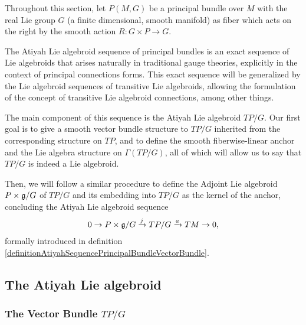 Throughout this section, let $P(M, G)$ be a principal bundle over $M$ with the real Lie group $G$ (a finite dimensional, smooth manifold) as fiber which acts on the right by the smooth action $R: G \times P \to G$.

The Atiyah Lie algebroid sequence of principal bundles is an exact sequence of Lie algebroids that arises naturally in traditional gauge theories, explicitly in the context of principal connections forms. This exact sequence will be generalized by the Lie algebroid sequences of transitive Lie algebroids, allowing the formulation of the concept of transitive Lie algebroid connections, among other things.

The main component of this sequence is the Atiyah Lie algebroid $TP/G$. Our first goal is to give a smooth vector bundle structure to $TP/G$ inherited from the corresponding structure on $TP$, and to define the smooth fiberwise-linear anchor and the Lie algebra structure on $\Gamma(TP/G)$, all of which will allow us to say that $TP/G$ is indeed a Lie algebroid.

Then, we will follow a similar procedure to define the Adjoint Lie algebroid $P \times \mathfrak{g}/G$ of $TP/G$ and its embedding into $TP/G$ as the kernel of the anchor, concluding the Atiyah Lie algebroid sequence
\begin{align*}
    0 \to P \times \mathfrak{g}/G \xrightarrow{j} TP/G \xrightarrow{a} TM \to 0,
\end{align*}
formally introduced in definition \ref{definitionAtiyahSequencePrincipalBundleVectorBundle}.

\subsection{The Atiyah Lie algebroid}

\subsubsection{The Vector Bundle $TP/G$}

